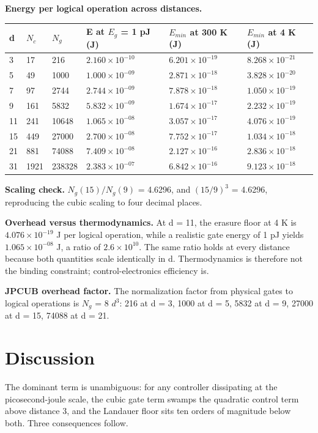 \documentclass[11pt]{article}
\begin{document}
\textbf{Energy per logical operation across distances.}

\begin{table}[h]
\centering
\begin{tabular}{llllll}
\toprule
d & $N_{c}$ & $N_{g}$ & E at $E_{g}$ = 1 pJ (J) & $E_{min}$ at 300 K (J) & $E_{min}$ at 4 K (J) \\
\midrule
3 & 17 & 216 & $2.160\times 10^{-10}$ & $6.201\times 10^{-19}$ & $8.268\times 10^{-21}$ \\
5 & 49 & 1000 & $1.000\times 10^{-09}$ & $2.871\times 10^{-18}$ & $3.828\times 10^{-20}$ \\
7 & 97 & 2744 & $2.744\times 10^{-09}$ & $7.878\times 10^{-18}$ & $1.050\times 10^{-19}$ \\
9 & 161 & 5832 & $5.832\times 10^{-09}$ & $1.674\times 10^{-17}$ & $2.232\times 10^{-19}$ \\
11 & 241 & 10648 & $1.065\times 10^{-08}$ & $3.057\times 10^{-17}$ & $4.076\times 10^{-19}$ \\
15 & 449 & 27000 & $2.700\times 10^{-08}$ & $7.752\times 10^{-17}$ & $1.034\times 10^{-18}$ \\
21 & 881 & 74088 & $7.409\times 10^{-08}$ & $2.127\times 10^{-16}$ & $2.836\times 10^{-18}$ \\
31 & 1921 & 238328 & $2.383\times 10^{-07}$ & $6.842\times 10^{-16}$ & $9.123\times 10^{-18}$ \\
\bottomrule
\end{tabular}
\end{table}

\textbf{Scaling check.} $N_{g}(15) / N_{g}(9)$ = 4.6296, and $(15/9)^{3}$ = 4.6296, reproducing the cubic scaling to four decimal places.

\textbf{Overhead versus thermodynamics.} At d = 11, the erasure floor at 4 K is $4.076\times 10^{-19}$ J per logical operation, while a realistic gate energy of 1 pJ yields $1.065\times 10^{-08}$ J, a ratio of $2.6\times 10^{10}$. The same ratio holds at every distance because both quantities scale identically in d. Thermodynamics is therefore not the binding constraint; control-electronics efficiency is.

\textbf{JPCUB overhead factor.} The normalization factor from physical gates to logical operations is $N_{g}$ = 8 $d^{3}$: 216 at d = 3, 1000 at d = 5, 5832 at d = 9, 27000 at d = 15, 74088 at d = 21.

\section{Discussion}
The dominant term is unambiguous: for any controller dissipating at the picosecond-joule scale, the cubic gate term swamps the quadratic control term above distance 3, and the Landauer floor sits ten orders of magnitude below both. Three consequences follow.
\end{document}
